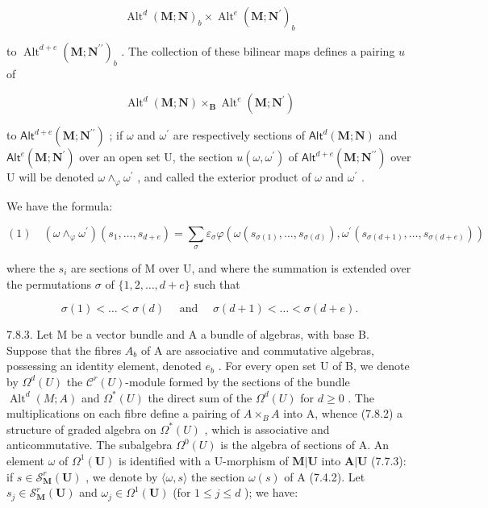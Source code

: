 \[
\operatorname{Alt} ^ {d} (\mathbf {M}; \mathbf {N}) _ {b} \times \operatorname{Alt} ^ {e} (\mathbf {M}; \mathbf {N} ^ {\prime}) _ {b}
\]

to \(\operatorname{Alt}^{d + e}(\mathbf{M};\mathbf{N}^{\prime \prime})_{b}\) . The collection of these bilinear maps defines a pairing \(u\) of

\[
\operatorname{Alt} ^ {d} (\mathbf {M}; \mathbf {N}) \times_ {\mathbf {B}} \operatorname{Alt} ^ {e} (\mathbf {M}; \mathbf {N} ^ {\prime})
\]

to \(\mathsf{Alt}^{d + e}(\mathbf{M};\mathbf{N}^{\prime \prime})\) ; if \(\omega\) and \(\omega^{\prime}\) are respectively sections of \(\mathsf{Alt}^{d}(\mathbf{M};\mathbf{N})\) and \(\mathsf{Alt}^{e}(\mathbf{M};\mathbf{N}^{\prime})\) over an open set U, the section \(u(\omega ,\omega^{\prime})\) of \(\mathsf{Alt}^{d + e}(\mathbf{M};\mathbf{N}^{\prime \prime})\) over U will be denoted \(\omega \wedge_{\varphi}\omega^{\prime}\) , and called the exterior product of \(\omega\) and \(\omega^{\prime}\) .

We have the formula:

\[
(1) \quad \left(\omega \wedge_ {\varphi} \omega^ {\prime}\right) \left(s _ {1}, \dots , s _ {d + e}\right) = \sum_ {\sigma} \varepsilon_ {\sigma} \varphi \left(\omega \left(s _ {\sigma (1)}, \dots , s _ {\sigma (d)}\right), \omega^ {\prime} \left(s _ {\sigma (d + 1)}, \dots , s _ {\sigma (d + e)}\right)\right)
\]

where the \(s_{i}\) are sections of M over U, and where the summation is extended over the permutations \(\sigma\) of \(\{1,2,\ldots,d+e\}\) such that

\[
\sigma (1) <   \dots <   \sigma (d) \quad \text { and } \quad \sigma (d + 1) <   \dots <   \sigma (d + e).
\]

7.8.3. Let M be a vector bundle and A a bundle of algebras, with base B. Suppose that the fibres \(A_{b}\) of A are associative and commutative algebras, possessing an identity element, denoted \(e_{b}\) . For every open set U of B, we denote by \(\Omega^{d}(U)\) the \(\mathcal{C}^{r}(U)\)-module formed by the sections of the bundle \(\operatorname{Alt}^{d}(M;A)\) and \(\Omega^{*}(U)\) the direct sum of the \(\Omega^{d}(U)\) for \(d\geqslant0\) . The multiplications on each fibre define a pairing of \(A\times_{B}A\) into A, whence (7.8.2) a structure of graded algebra on \(\Omega^{*}(U)\) , which is associative and anticommutative. The subalgebra \(\Omega^{0}(U)\) is the algebra of sections of A. An element \(\omega\) of \(\Omega^{1}(\mathbf{U})\) is identified with a U-morphism of \(\mathbf{M}|\mathbf{U}\) into \(\mathbf{A}|\mathbf{U}\) (7.7.3): if \(s\in\mathcal{S}_{\mathbf{M}}^{r}(\mathbf{U})\) , we denote by \(\langle\omega,s\rangle\) the section \(\omega(s)\) of A (7.4.2). Let \(s_{j}\in\mathcal{S}_{\mathbf{M}}^{r}(\mathbf{U})\) and \(\omega_{j}\in\Omega^{1}(\mathbf{U})\) (for \(1\leqslant j\leqslant d\) ); we have:

